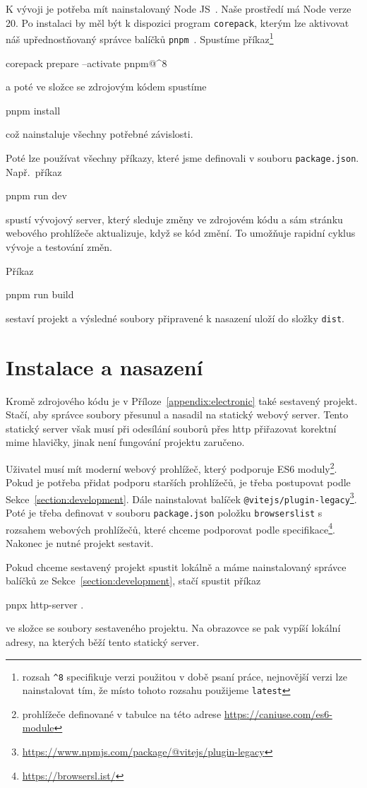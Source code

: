K vývoji je potřeba mít nainstalovaný Node JS~\cite{openjsfoundation_nodejs_}.
Naše prostředí má Node verze 20.
Po instalaci by měl být k dispozici program \texttt{corepack}, kterým lze aktivovat náš upřednostňovaný správce balíčků \texttt{pnpm}~\cite{pnpm_pnpmfast_}.
Spustíme příkaz\footnote{rozsah \texttt{\^{}8} specifikuje verzi použitou v době psaní práce, nejnovější verzi lze nainstalovat tím, že místo tohoto rozsahu použijeme \texttt{latest}}
\begin{command}
  corepack prepare --activate pnpm@^8
\end{command}
a poté ve složce  se zdrojovým kódem spustíme
\begin{command}
  pnpm install
\end{command}
což nainstaluje všechny potřebné závislosti.

Poté lze používat všechny příkazy, které jsme definovali v souboru \texttt{package.json}.
Např.~příkaz
\begin{command}
  pnpm run dev
\end{command}
spustí vývojový server, který sleduje změny ve zdrojovém kódu a sám stránku webového prohlížeče aktualizuje, když se kód změní.
To umožňuje rapidní cyklus vývoje a testování změn.

Příkaz
\begin{command}
  pnpm run build
\end{command}
sestaví projekt a výsledné soubory připravené k nasazení uloží do složky \texttt{dist}.

\section{Instalace a nasazení}

Kromě zdrojového kódu je v Příloze~\ref{appendix:electronic} také sestavený projekt.
Stačí, aby správce soubory přesunul a nasadil na statický webový server.
Tento statický server však musí při odesílání souborů přes \acrshort{http} přiřazovat korektní \acrshort{mime} hlavičky, jinak není fungování projektu zaručeno.

Uživatel musí mít moderní webový prohlížeč, který podporuje ES6 moduly\footnote{prohlížeče definované v tabulce na této adrese \url{https://caniuse.com/es6-module}}.
Pokud je potřeba přidat podporu starších prohlížečů, je třeba postupovat podle Sekce~\ref{section:development}.
Dále nainstalovat balíček \texttt{@vitejs/plugin-legacy}\footnote{\url{https://www.npmjs.com/package/@vitejs/plugin-legacy}}.
Poté je třeba definovat v souboru \texttt{package.json} položku \texttt{browserslist} s rozsahem webových prohlížečů, které chceme podporovat podle specifikace\footnote{\url{https://browsersl.ist/}}.
Nakonec je nutné projekt sestavit.

Pokud chceme sestavený projekt spustit lokálně a máme nainstalovaný správce balíčků ze Sekce~\ref{section:development}, stačí spustit příkaz
\begin{command}
  pnpx http-server .
\end{command}
ve složce se soubory sestaveného projektu.
Na obrazovce se pak vypíší lokální adresy, na kterých běží tento statický server.
